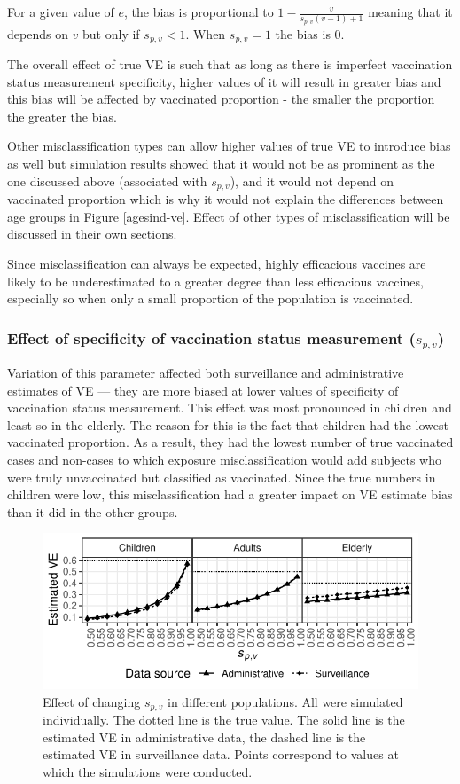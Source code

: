 \documentclass[11pt]{article}
\begin{document}
For a given value of $e$, the bias is proportional to $1 - \frac{v}{s_{p,v}(v-1)+1}$ meaning that it depends on $v$ but only if $s_{p,v}<1$. When $s_{p,v}=1$ the bias is 0.

The overall effect of true VE is such that as long as there is imperfect vaccination status measurement specificity, higher values of it will result in greater bias and this bias will be affected by vaccinated proportion - the smaller the proportion the greater the bias. 

Other misclassification types can allow higher values of true VE to introduce bias as well but simulation results showed that it would not be as prominent as the one discussed above (associated with $s_{p,v}$), and it would not depend on vaccinated proportion which is why it would not explain the differences between age groups in Figure \ref{agesind-ve}. Effect of other types of misclassification will be discussed in their own sections.

Since misclassification can always be expected, highly efficacious vaccines are likely to be underestimated to a greater degree than less efficacious vaccines, especially so when only a small proportion of the population is vaccinated.

\pagebreak
\subsubsection{Effect of specificity of vaccination status measurement ($s_{p,v}$)}

Variation of this parameter affected both surveillance and administrative estimates of VE --- they are more biased at lower values of specificity of vaccination status measurement. This effect was most pronounced in children and least so in the elderly. The reason for this is the fact that children had the lowest vaccinated proportion. As a result, they had the lowest number of true vaccinated cases and non-cases to which exposure misclassification would add subjects who were truly unvaccinated but classified as vaccinated. Since the true numbers in children were low, this misclassification had a greater impact on VE estimate bias than it did in the other groups.

\begin{figure}[h]
	\centering
		\includegraphics[width=0.75\linewidth]{../fig-agesind/agesind-spec_vac.pdf}
		\caption{
Effect of changing $s_{p,v}$ in different populations. All were simulated individually. The dotted line is the true value. The solid line is the estimated VE in administrative data, the dashed line is the estimated VE in surveillance data. Points correspond to values at which the simulations were conducted. \label{fig:agesind-spv}
		}
\end{figure}
\end{document}
